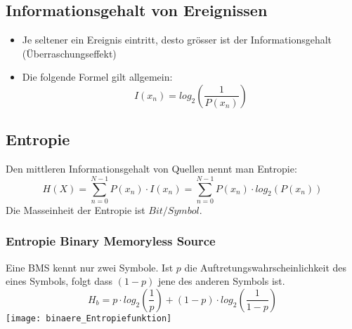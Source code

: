 \subsection{Informationsgehalt von Ereignissen}
\begin{itemize}
    \item Je seltener ein Ereignis eintritt, desto grösser ist der
    Informationsgehalt (Überraschungseffekt)
    \item Die folgende Formel gilt allgemein:
    \begin{equation*}
        I(x_n) = log_2(\frac{1}{P(x_n)})
    \end{equation*}
\end{itemize}
\subsection{Entropie}
Den mittleren Informationsgehalt von Quellen nennt man Entropie:
\begin{equation*}
    H(X) = \sum_{n=0}^{N-1} P(x_n) \cdot I(x_n) = \sum_{n=0}^{N-1} P(x_n) \cdot log_2(P(x_n))
\end{equation*}
Die Masseinheit der Entropie ist $Bit/Symbol$.
\subsubsection{Entropie Binary Memoryless Source}
Eine BMS kennt nur zwei Symbole. Ist $p$ die Auftretungswahrscheinlichkeit des eines Symbols, folgt dass $(1-p)$ jene des anderen Symbols ist.
\begin{equation*}
    H_b = p  \cdot log_2(\frac{1}{p}) + (1-p)  \cdot log_2(\frac{1}{1-p})
\end{equation*}
\texttt{[image: binaere\_Entropiefunktion]}
